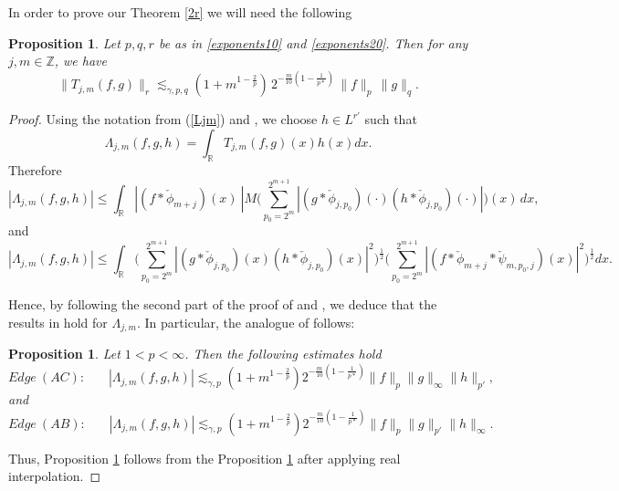 \documentclass{amsart}
\newcommand{\R}{\mathbb{R}}
\newcommand{\Z}{\mathbb{Z}}
\newcommand{\N}{\mathbb{N}}
\newtheorem{proposition}[theorem]{Proposition}
\theoremstyle{definition}
\theoremstyle{remark}
\numberwithin{equation}{section}
\begin{document}
In order to prove our Theorem \ref{2r} we will need the following

\begin{proposition}\label{Tjmb}
	Let $p, q, r$ be as in \eqref{exponents10} and \eqref{exponents20}. Then for any $j, m\in\Z$, we have
	\begin{equation}\label{Tjm-pqr}
	\|T_{j,m}(f,g)\|_r\lesssim_{\gamma,p,q}(1+m^{1-\frac{2}{p}})\,2^{-\frac{m}{10}(1-\frac{1}{p*})}\,\|f\|_p\,\|g\|_q.
	\end{equation}
\end{proposition}

\begin{proof}
Using the notation from (\ref{Ljm}) and \cite{lie2015triangle}, we choose $h\in L^{r'}$ such that
\[
\Lambda_{j,m}(f,g,h)= \int_\R T_{j,m}(f,g)(x)h(x)dx.
\]
Therefore
\[
	|\Lambda_{j,m}(f,g,h)|\le %
	\int_\R |(f*\check{\phi}_{m+j})(x)\:|M\Bigg(\sum_{p_0=2^m}^{2^{m+1}}|(g*\check{\phi}_{j, p_0})(\cdot) (h*\check{\phi}_{j, p_0})(\cdot)|\Bigg)(x)\,dx,
\]
and
\[
	|\Lambda_{j,m}(f,g,h)|\le %
	\int_\R\Bigg(\sum_{p_0=2^m}^{2^{m+1}}|(g*\check{\phi}_{j, p_0})(x)(h*\check{\phi}_{j, p_0})(x)|^2\Bigg)^\frac{1}{2} \Bigg(\sum_{p_0=2^m}^{2^{m+1}}|(f*\check{\phi}_{m+j}*\check{\psi}_{m, p_0, j})(x)|^2\Bigg)^\frac{1}{2}dx.
\]

Hence, by following the second part of the proof of \cite[Proposition  4.2 ]{lie2015triangle} and \cite[Proposition 4.3 ]{lie2015triangle}, we deduce that the results in \cite{lie2015triangle} hold for $\Lambda_{j,m}$. In particular, the analogue of \cite[Theorem 3.3]{lie2015triangle} follows:

\begin{proposition}\label{DeltaM}
Let $1<p<\infty$. Then the following estimates hold
\begin{equation}
Edge\:(AC):\:\:\:\:\:\:\:\:|\Lambda_{j,m}(f,g,h)|\lesssim_{\gamma,p} (1+m^{1-\frac{2}{p}})2^{-\frac{m}{10}(1-\frac{1}{p*})}\|f\|_p\|g\|_\infty \|h\|_{p'},
\end{equation}
and
\begin{equation}
Edge\:(AB):\:\:\:\:\:\:\:\:|\Lambda_{j,m}(f,g,h)|\lesssim_{\gamma,p} (1+m^{1-\frac{2}{p}})2^{-\frac{m}{10}(1-\frac{1}{p*})} \|f\|_p\|g\|_{p'} \|h\|_\infty.
\end{equation}
\end{proposition}

Thus, Proposition \ref{Tjmb} follows from the Proposition \ref{DeltaM} after applying real interpolation.
\end{proof}
\medskip
\end{document}
